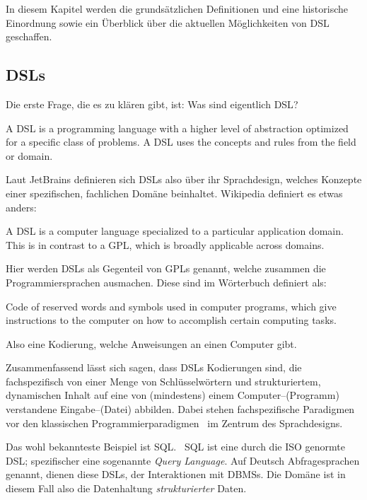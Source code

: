 In diesem Kapitel werden die grundsätzlichen Definitionen und eine historische Einordnung sowie ein Überblick über die aktuellen Möglichkeiten von \ac{DSL} geschaffen.

\subsection{\aclp{DSL}}\label{subsec:domain-specific-languages}
Die erste Frage, die es zu klären gibt, ist: Was sind eigentlich \ac{DSL}?
\begin{displayquote}
    A \ac{DSL} is a programming language with a higher level of abstraction optimized for a specific class of problems.
    A \ac{DSL} uses the concepts and rules from the field or domain.
\end{displayquote}
Laut JetBrains definieren sich \acp{DSL} also über ihr Sprachdesign, welches Konzepte einer spezifischen, fachlichen Domäne beinhaltet.
Wikipedia definiert es etwas anders:
\begin{displayquote}
    A \ac{DSL} is a computer language specialized to a particular application domain.
    This is in contrast to a \ac{GPL}, which is broadly applicable across domains.
\end{displayquote}
Hier werden \acp{DSL} als Gegenteil von \acp{GPL} genannt, welche zusammen die Programmiersprachen ausmachen.
Diese sind im Wörterbuch definiert als:
\begin{displayquote}
    Code of reserved words and symbols used in computer programs, which give instructions to the computer on how to accomplish certain computing tasks.
\end{displayquote}
Also eine Kodierung, welche Anweisungen an einen Computer gibt.

Zusammenfassend lässt sich sagen, dass \acp{DSL} Kodierungen sind, die fachspezifisch von einer Menge von Schlüsselwörtern und strukturiertem, dynamischen Inhalt auf eine von (mindestens) einem Computer--(Programm) verstandene Eingabe--(Datei) abbilden.
Dabei stehen fachspezifische Paradigmen vor den klassischen Programmierparadigmen~\autocite{wikipedia-contributors-2024D} im Zentrum des Sprachdesigns.

Das wohl bekannteste Beispiel ist \ac{SQL}.~\autocite{unknown-author-2023}
\ac{SQL} ist eine durch die \ac{ISO} genormte \ac{DSL}; spezifischer eine sogenannte \textit{Query Language}.
Auf Deutsch Abfragesprachen genannt, dienen diese \acp{DSL}, der Interaktionen mit \acp{DBMS}.
Die Domäne ist in diesem Fall also die Datenhaltung \textit{strukturierter} Daten.

